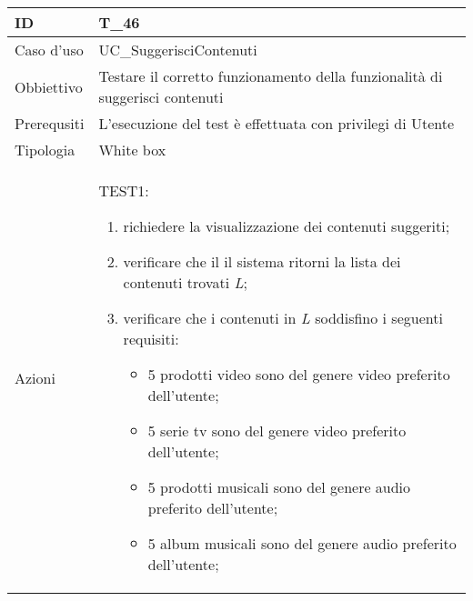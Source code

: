 \begin{table}[hb]
    \centering
    \begin{tabular}{ |p{2cm}|p{10cm}|  }
        \hline
        ID          & T\_46                                                                              \\\hline
        Caso d'uso  & UC\_SuggerisciContenuti                                                           \\\hline
        Obbiettivo  & Testare il corretto funzionamento della funzionalità di suggerisci contenuti \\\hline
        Prerequsiti & L'esecuzione del test è effettuata con privilegi di Utente                         \\\hline
        Tipologia   & White box                                                                          \\\hline
        Azioni      &
        TEST1:
        \begin{enumerate}[nosep, topsep=0pt]
            \item richiedere la visualizzazione dei contenuti suggeriti;
            \item verificare che il il sistema ritorni la lista dei contenuti trovati \emph{L};
            \item verificare che i contenuti in \emph{L} soddisfino i seguenti requisiti:
            \begin{itemize}
                \item 5 prodotti video sono del genere video preferito dell'utente;
                \item 5 serie tv sono del genere video preferito dell'utente;
                \item 5 prodotti musicali sono del genere audio preferito dell'utente;
                \item 5 album musicali sono del genere audio preferito dell'utente;
            \end{itemize}
        \end{enumerate}
        \\\hline
    \end{tabular}
\end{table}

